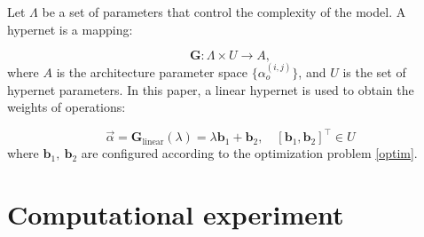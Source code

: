 \documentclass[runningheads]{llncs}
\begin{document}
Let $\Lambda$ be a set of parameters that control the complexity of the model. A hypernet is a mapping:

\begin{equation}
\mathbf{G}: \Lambda \times U \to A,
\end{equation}
where $A$ is the architecture parameter space $\{\alpha^{(i, j)} _o\}$, and $U$ is the set of hypernet parameters.
In this paper, a linear hypernet is used to obtain the weights of operations:

\begin{equation}\label{hypernet}
 \vec{\alpha} = \mathbf{G}_{\mathrm{linear}}(\lambda) = \lambda \mathbf{b}_1 + \mathbf{b}_2, \quad [\mathbf{b}_1, \mathbf{b}_2]^\top \in U
 \end{equation}
where $\mathbf{b}_1, ~\mathbf{b}_2$ are configured according to the optimization problem \ref{optim}.

\section{Computational experiment}

%
%
%
\newpage


\nocite{*}
%
%
%
%
%
\end{document}
